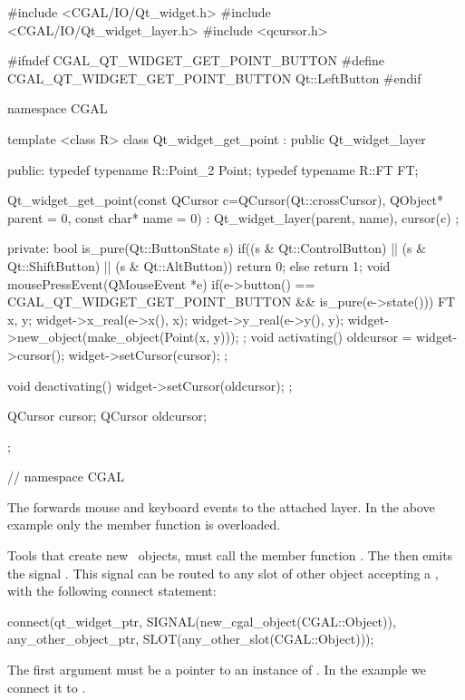 \begin{ccExampleCode}
#include <CGAL/IO/Qt_widget.h>
#include <CGAL/IO/Qt_widget_layer.h>
#include <qcursor.h>

#ifndef CGAL_QT_WIDGET_GET_POINT_BUTTON
#define CGAL_QT_WIDGET_GET_POINT_BUTTON Qt::LeftButton
#endif

namespace CGAL {
template <class R>
class Qt_widget_get_point : public Qt_widget_layer
{
public:
  typedef typename R::Point_2	Point;
  typedef typename R::FT	FT;
  
  Qt_widget_get_point(const QCursor c=QCursor(Qt::crossCursor),
		      QObject* parent = 0, const char* name = 0) :
    Qt_widget_layer(parent, name), cursor(c) {};
  
private:
  bool is_pure(Qt::ButtonState s){
    if((s & Qt::ControlButton) ||
       (s & Qt::ShiftButton) ||
       (s & Qt::AltButton))
      return 0;
    else
      return 1;
  }
  void mousePressEvent(QMouseEvent *e)
  {
    if(e->button() == CGAL_QT_WIDGET_GET_POINT_BUTTON
       && is_pure(e->state()))
    {
      FT x, y;
      widget->x_real(e->x(), x);
      widget->y_real(e->y(), y);
      widget->new_object(make_object(Point(x, y)));
    }
  };
  void activating()
  {
    oldcursor = widget->cursor();
    widget->setCursor(cursor);
  };
  
  void deactivating()
  {
    widget->setCursor(oldcursor);
  };

  QCursor cursor;
  QCursor oldcursor;
};
} // namespace CGAL
\end{ccExampleCode}

The  forwards mouse and keyboard events to the attached layer.
In the above example only the  member function is overloaded.

Tools that create new \cgal\ objects, must call the member 
function . The
 then emits the signal
. This signal can be routed to
any slot of other object accepting a , with the
following connect statement:
\begin{ccExampleCode}
connect(qt_widget_ptr, SIGNAL(new_cgal_object(CGAL::Object)), 
        any_other_object_ptr, SLOT(any_other_slot(CGAL::Object)));
\end{ccExampleCode}

The first argument must be a pointer to an instance of .
In the example we connect it to .

